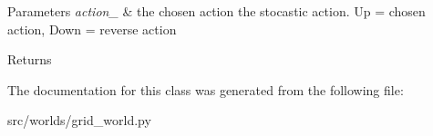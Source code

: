 \begin{DoxyParams}{Parameters}
{\em action\+\_\+} & the chosen action  the stocastic action. Up = chosen action, Down = reverse action\\
\hline
\end{DoxyParams}
\begin{DoxyReturn}{Returns}

\end{DoxyReturn}


The documentation for this class was generated from the following file\+:\begin{DoxyCompactItemize}
\item 
src/worlds/grid\+\_\+world.\+py\end{DoxyCompactItemize}

